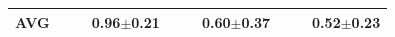 \documentclass[encoding=utf8,british]{tumphthesis}
\begin{document}
\begin{table}[H]
\begin{subtable}{1\textwidth}
{\begin{tabular}{|l|llr|llr|llr|}
\textbf{AVG}                             &                                                      &                                                       & \textbf{0.96$\pm$0.21}                           &                                                      &                                                       & \textbf{0.60$\pm$0.37}                           &                                                      &                                                       & \textbf{0.52$\pm$0.23}                          
 \\ \hline
\end{tabular}}
\end{subtable}

\bigskip
\begin{subtable}{1\textwidth}
\label{tab:benchmark-radmon-alCSOO}


\end{subtable}
\end{table}
\end{document}
